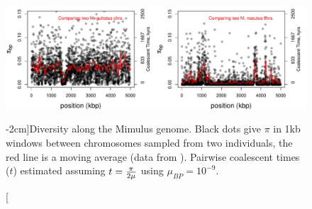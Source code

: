 \begin{figure}
\begin{center}
  \includegraphics[width = \textwidth]{figures/Genetic_drift/Demography/Mimulus_coalescent_times.pdf}
\end{center}
\caption[][-2cm]{Diversity along the Mimulus genome. Black dots give $\pi$ in 1kb windows between chromosomes sampled from two individuals, the red line is a
  moving average (data from  \citeauthor{brandvain:14}). Pairwise coalescent times ($t$) estimated assuming $t= \nicefrac{\pi}{2 \mu} $ using $\mu_{BP}=10^{-9}$.  } \label{fig:Mimulus_bottleneck}
\end{figure}
